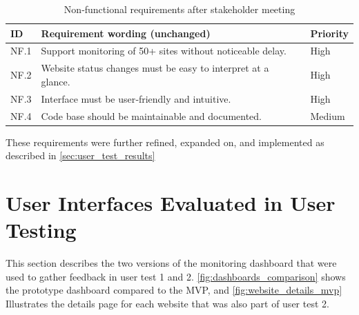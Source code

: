 \begin{table}[H]
\centering
\begin{tabular}{| l  |p{}  |l |} 
\hline
\textbf{ID} & \textbf{Requirement wording (unchanged)} & \textbf{Priority} \\ \hline
NF.1 & Support monitoring of 50+ sites without noticeable delay.& High \\ \hline
NF.2 & Website status changes must be easy to interpret at a glance. & High \\ \hline
NF.3 & Interface must be user‑friendly and intuitive. & High \\ \hline
NF.4 & Code base should be maintainable and documented. & Medium \\ \hline
\end{tabular}
\caption{Non‑functional requirements after stakeholder meeting}
\label{tab:stakeholder_nonfunc_res}
\end{table}

These requirements were further refined, expanded on, and implemented as described in \autoref{sec:user_test_results}



\section{User Interfaces Evaluated in User Testing}
\label{sec:artefact_snapshot}

This section describes the two versions of the monitoring dashboard that were used to gather feedback in user test 1 and 2. \autoref{fig:dashboards_comparison} shows the prototype dashboard compared to the MVP, and  \autoref{fig:website_details_mvp} Illustrates the details page for each website that was also part of user test 2.


